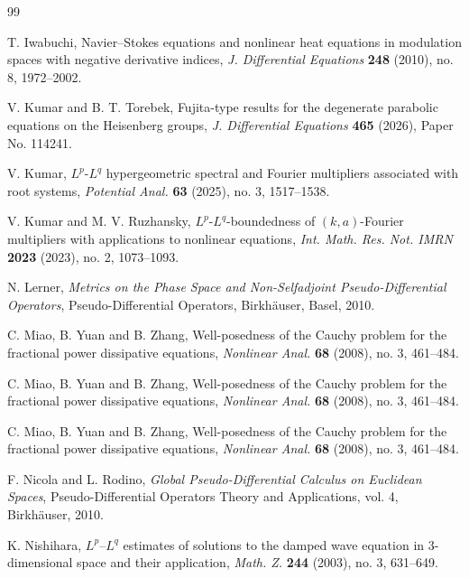 \documentclass[12pt, reqno]{amsart}
\theoremstyle{definition}
\theoremstyle{remark}
\numberwithin{equation}{section}
\begin{document}
\begin{thebibliography}{99}


T. Iwabuchi,
Navier--Stokes equations and nonlinear heat equations in modulation spaces with negative derivative indices,
\emph{J. Differential Equations} \textbf{248} (2010), no. 8, 1972--2002.

V. Kumar and B. T. Torebek,
Fujita-type results for the degenerate parabolic equations on the Heisenberg groups,
\emph{J. Differential Equations} \textbf{465} (2026), Paper No. 114241.

V. Kumar,
$L^p$-$L^q$ hypergeometric spectral and Fourier multipliers associated with root systems,
\emph{Potential Anal.} \textbf{63} (2025), no. 3, 1517--1538.

V. Kumar and M. V. Ruzhansky,
$L^p$-$L^q$-boundedness of $(k,a)$-Fourier multipliers with applications to nonlinear equations,
\emph{Int. Math. Res. Not. IMRN} \textbf{2023} (2023), no. 2, 1073--1093.

N. Lerner,
\emph{Metrics on the Phase Space and Non-Selfadjoint Pseudo-Differential Operators},
Pseudo-Differential Operators, Birkh\"auser, Basel, 2010.

C. Miao, B. Yuan and B. Zhang,
Well-posedness of the Cauchy problem for the fractional power dissipative equations,
\emph{Nonlinear Anal.} \textbf{68} (2008), no. 3, 461--484.

C. Miao, B. Yuan and B. Zhang,
Well-posedness of the Cauchy problem for the fractional power dissipative equations,
\emph{Nonlinear Anal.} \textbf{68} (2008), no. 3, 461--484.

C. Miao, B. Yuan and B. Zhang,
Well-posedness of the Cauchy problem for the fractional power dissipative equations,
\emph{Nonlinear Anal.} \textbf{68} (2008), no. 3, 461--484.

F. Nicola and L. Rodino,
\emph{Global Pseudo-Differential Calculus on Euclidean Spaces},
Pseudo-Differential Operators Theory and Applications, vol. 4, Birkh\"auser, 2010.

K. Nishihara,
$L^p$--$L^q$ estimates of solutions to the damped wave equation in 3-dimensional space and their application,
\emph{Math. Z.} \textbf{244} (2003), no. 3, 631--649.


\end{thebibliography}
\end{document}
